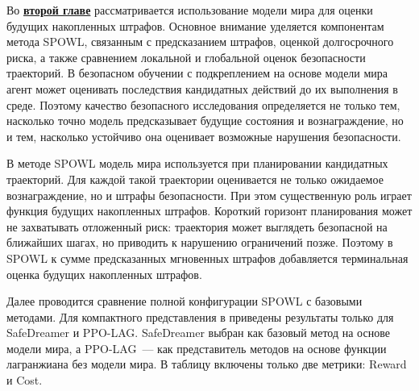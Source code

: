 Во \underline{\textbf{второй главе}} рассматривается использование модели мира для оценки будущих накопленных штрафов. Основное внимание уделяется компонентам метода SPOWL, связанным с предсказанием штрафов, оценкой долгосрочного риска, а также сравнением локальной и глобальной оценок безопасности траекторий. В безопасном обучении с подкреплением на основе модели мира агент может оценивать последствия кандидатных действий до их выполнения в среде. Поэтому качество безопасного исследования определяется не только тем, насколько точно модель предсказывает будущие состояния и вознаграждение, но и тем, насколько устойчиво она оценивает возможные нарушения безопасности.

В методе SPOWL модель мира используется при планировании кандидатных траекторий. Для каждой такой траектории оценивается не только ожидаемое вознаграждение, но и штрафы безопасности. При этом существенную роль играет функция будущих накопленных штрафов. Короткий горизонт планирования может не захватывать отложенный риск: траектория может выглядеть безопасной на ближайших шагах, но приводить к нарушению ограничений позже. Поэтому в SPOWL к сумме предсказанных мгновенных штрафов добавляется терминальная оценка будущих накопленных штрафов.

Далее проводится сравнение полной конфигурации SPOWL с базовыми методами. Для компактного представления в  приведены результаты только для SafeDreamer и PPO-LAG. SafeDreamer выбран как базовый метод на основе модели мира, а PPO-LAG~--- как представитель методов на основе функции лагранжиана без модели мира. В таблицу включены только две метрики: Reward и Cost.

\begin{table}[ht]
\centering
\caption{Сравнение SPOWL с базовыми методами на задачах Safety Gymnasium. Reward~--- эпизодическое вознаграждение, Cost~--- накопленные штрафы безопасности за эпизод.}
\label{tab:synopsis_spowl_baselines}
\tiny
\setlength{\tabcolsep}{2pt}
\renewcommand{\arraystretch}{1.0}
\end{table}

